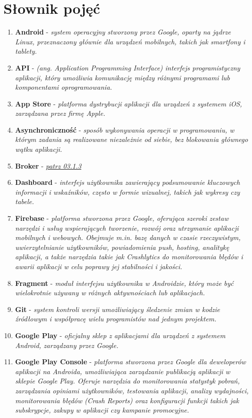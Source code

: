 \section{Słownik pojęć}
\begin{enumerate}[leftmargin=*]
\item \textbf{Android} - \textit{system operacyjny stworzony przez Google, oparty na jądrze Linux, przeznaczony głównie dla urządzeń mobilnych, takich jak smartfony i tablety.}
\item \textbf{API} - \textit{(ang. Application Programming Interface) interfejs programistyczny aplikacji, który umożliwia komunikację między różnymi programami lub komponentami oprogramowania.}
\item \textbf{App Store} - \textit{platforma dystrybucji aplikacji dla urządzeń z systemem iOS, zarządzana przez firmę Apple.}
\item \textbf{Asynchroniczność} - \textit{sposób wykonywania operacji w programowaniu, w którym zadania są realizowane niezależnie od siebie, bez blokowania głównego wątku aplikacji.}
\item \textbf{Broker} - \textit{\hyperlink{broker}{patrz 03.1.3}}
\item \textbf{Dashboard} - \textit{interfejs użytkownika zawierający podsumowanie kluczowych informacji i wskaźników, często w formie wizualnej, takich jak wykresy czy tabele.}
\item \textbf{Firebase} - \textit{platforma stworzona przez Google, oferująca szeroki zestaw narzędzi i usług wspierających tworzenie, rozwój oraz utrzymanie aplikacji mobilnych i webowych. Obejmuje m.in. bazę danych w czasie rzeczywistym, uwierzytelnianie użytkowników, powiadomienia push, hosting, analitykę aplikacji, a także narzędzia takie jak Crashlytics do monitorowania błędów i awarii aplikacji w celu poprawy jej stabilności i jakości.}
\item \textbf{Fragment} - \textit{moduł interfejsu użytkownika w Androidzie, który może być wielokrotnie używany w różnych aktywnościach lub aplikacjach.}
\item \textbf{Git} - \textit{system kontroli wersji umożliwiający śledzenie zmian w kodzie źródłowym i współpracę wielu programistów nad jednym projektem.}
\item \textbf{Google Play} - \textit{oficjalny sklep z aplikacjami dla urządzeń z systemem Android, zarządzany przez Google.}
\item \textbf{Google Play Console} - \textit{platforma stworzona przez Google dla deweloperów aplikacji na Androida, umożliwiająca zarządzanie publikacją aplikacji w sklepie Google Play. Oferuje narzędzia do monitorowania statystyk pobrań, zarządzania opiniami użytkowników, testowania aplikacji, analizy wydajności, monitorowania błędów (Crash Reports) oraz konfiguracji funkcji takich jak subskrypcje, zakupy w aplikacji czy kampanie promocyjne.}

\end{enumerate}
